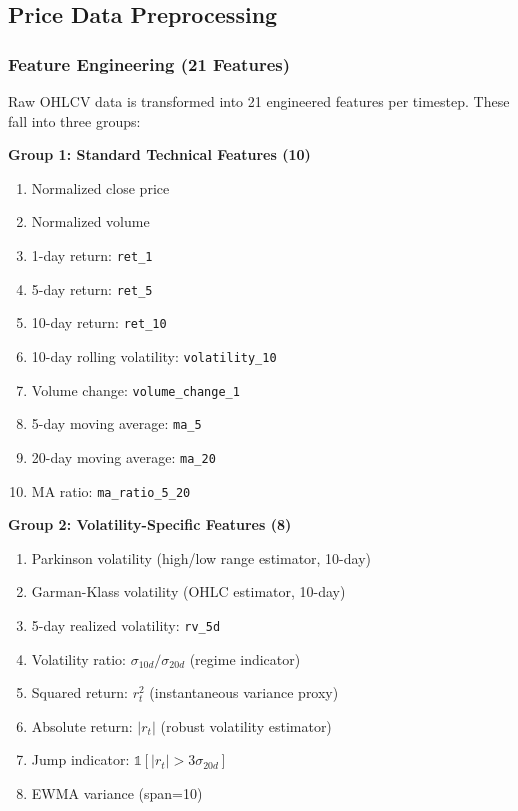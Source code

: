 \documentclass[12pt,a4paper]{article}
\begin{document}
\subsection{Price Data Preprocessing}

\subsubsection{Feature Engineering (21 Features)}

Raw OHLCV data is transformed into 21 engineered features per timestep. These fall into three groups:

\textbf{Group 1: Standard Technical Features (10)}
\begin{enumerate}[noitemsep]
    \item Normalized close price
    \item Normalized volume
    \item 1-day return: \texttt{ret\_1}
    \item 5-day return: \texttt{ret\_5}
    \item 10-day return: \texttt{ret\_10}
    \item 10-day rolling volatility: \texttt{volatility\_10}
    \item Volume change: \texttt{volume\_change\_1}
    \item 5-day moving average: \texttt{ma\_5}
    \item 20-day moving average: \texttt{ma\_20}
    \item MA ratio: \texttt{ma\_ratio\_5\_20}
\end{enumerate}

\textbf{Group 2: Volatility-Specific Features (8)}
\begin{enumerate}
    \item Parkinson volatility (high/low range estimator, 10-day)
    \item Garman-Klass volatility (OHLC estimator, 10-day)
    \item 5-day realized volatility: \texttt{rv\_5d}
    \item Volatility ratio: $\sigma_{10d}/\sigma_{20d}$ (regime indicator)
    \item Squared return: $r_t^2$ (instantaneous variance proxy)
    \item Absolute return: $|r_t|$ (robust volatility estimator)
    \item Jump indicator: $\mathbb{1}[|r_t| > 3\sigma_{20d}]$
    \item EWMA variance (span=10)
\end{enumerate}
\end{document}

